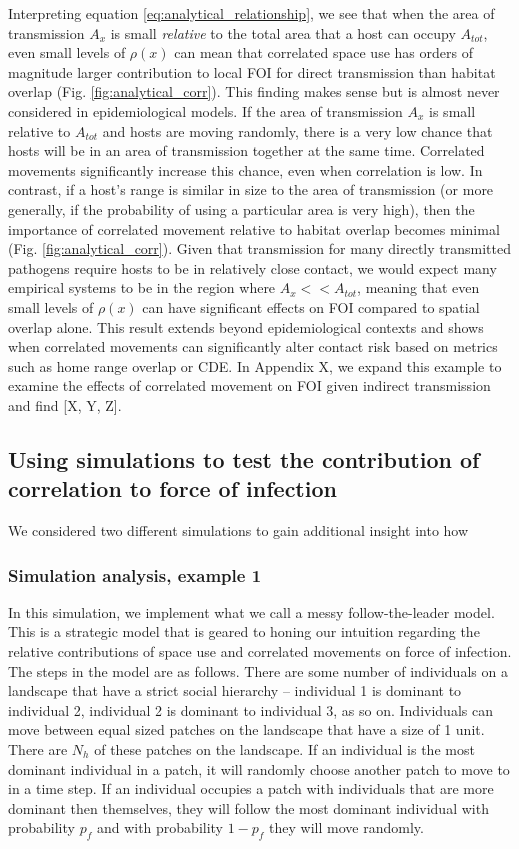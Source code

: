 ﻿\documentclass[11pt]{article}
\begin{document}
Interpreting equation \ref{eq:analytical_relationship}, we see that when the area of transmission $A_x$ is small \emph{relative} to the total area that a host can occupy $A_{tot}$, even small levels of $\rho(x)$ can mean that correlated space use has orders of magnitude larger contribution to local FOI for direct transmission than habitat overlap (Fig. \ref{fig:analytical_corr}). This finding makes sense but is almost never considered in epidemiological models. If the area of transmission $A_x$ is small relative to $A_{tot}$ and hosts are moving randomly, there is a very low chance that hosts will be in an area of transmission together at the same time. Correlated movements significantly increase this chance, even when correlation is low. In contrast, if a host's range is similar in size to the area of transmission (or more generally, if the probability of using a particular area is very high), then the importance of correlated movement relative to habitat overlap becomes minimal (Fig. \ref{fig:analytical_corr}).  Given that transmission for many directly transmitted pathogens require hosts to be in relatively close contact, we would expect many empirical systems to be in the region where $A_x << A_{tot}$, meaning that even small levels of $\rho(x)$ can have significant effects on FOI compared to spatial overlap alone. This result extends beyond epidemiological contexts and shows when correlated movements can significantly alter contact risk based on metrics such as home range overlap or CDE. In Appendix X, we expand this example to examine the effects of correlated movement on FOI given indirect transmission and find [X, Y, Z].

\subsection*{Using simulations to test the contribution of correlation to force of infection}

We considered two different simulations to gain additional insight into how

\subsubsection*{Simulation analysis, example 1}

In this simulation, we implement what we call a messy follow-the-leader model.  This is a strategic model that is geared to honing our intuition regarding the relative contributions of space use and correlated movements on force of infection. The steps in the model are as follows. There are some number of individuals on a landscape that have a strict social hierarchy -- individual 1 is dominant to individual 2, individual 2 is dominant to individual 3, as so on.  Individuals can move between equal sized patches on the landscape that have a size of 1 unit. There are $N_h$ of these patches on the landscape. If an individual is the most dominant individual in a patch, it will randomly choose another patch to move to in a time step.  If an individual occupies a patch with individuals that are more dominant then themselves, they will follow the most dominant individual with probability $p_f$ and with probability $1 - p_f$ they will move randomly.
\end{document}
